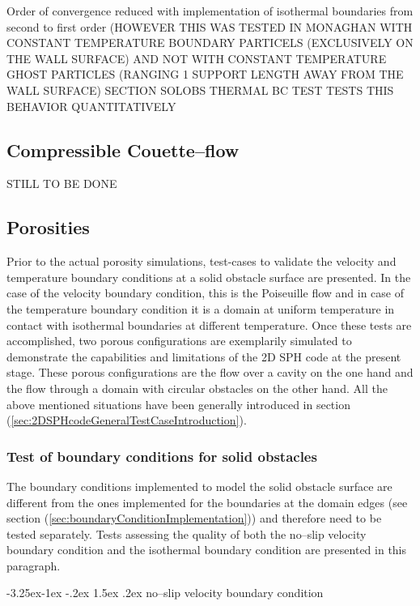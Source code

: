 \documentclass{report}
\makeatletter
\renewcommand\paragraph{\@startsection{paragraph}{4}{\z@}%
  {-3.25ex\@plus -1ex \@minus -.2ex}%
  {1.5ex \@plus .2ex}%
  {\normalfont\normalsize\bfseries}}
\makeatother
\begin{document}
Order of convergence reduced with implementation of isothermal boundaries from second to first order \cite{Cleary1999} (HOWEVER THIS WAS TESTED IN MONAGHAN WITH CONSTANT TEMPERATURE BOUNDARY PARTICELS (EXCLUSIVELY ON THE WALL SURFACE) AND NOT WITH CONSTANT TEMPERATURE GHOST PARTICLES (RANGING 1 SUPPORT LENGTH AWAY FROM THE WALL SURFACE)
SECTION SOLOBS THERMAL BC TEST TESTS THIS BEHAVIOR QUANTITATIVELY

\subsection{Compressible Couette--flow}
STILL TO BE DONE

\subsection{Porosities}
Prior to the actual porosity simulations, test-cases to validate the velocity and temperature boundary conditions at a solid obstacle surface are presented. In the case of the velocity boundary condition, this is the Poiseuille flow and in case of the temperature boundary condition it is a domain at uniform temperature in contact with isothermal boundaries at different temperature. Once these tests are accomplished, two porous configurations are exemplarily simulated to demonstrate the capabilities and limitations of the 2D SPH code at the present stage. These porous configurations are the flow over a cavity on the one hand and the flow through a domain with circular obstacles on the other hand. All the above mentioned situations have been generally introduced in section (\ref{sec:2DSPHcodeGeneralTestCaseIntroduction}). 

\subsubsection{Test of boundary conditions for solid obstacles}
\label{sec:TestSolobs_BC}
The boundary conditions implemented to model the solid obstacle surface are different from the ones implemented for the boundaries at the domain edges (see section (\ref{sec:boundaryConditionImplementation})) and therefore need to be tested separately.
Tests assessing the quality of both the no--slip velocity boundary condition and the isothermal boundary condition are presented in this paragraph. 

\paragraph{no--slip velocity boundary condition}
\label{sec:TestSolobs_BC_noSlip}
\end{document}
